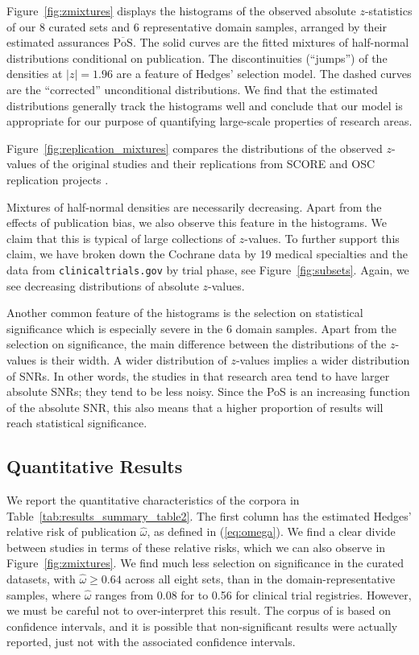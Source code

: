 \documentclass[11pt]{article}
\begin{document}
Figure~\ref{fig:zmixtures} displays the histograms of the observed absolute $z$-statistics of our 8 curated sets and 6 representative domain samples, arranged by their estimated assurances $\overline{\text{PoS}}$.
The solid curves are the fitted mixtures of half-normal distributions conditional on publication. The discontinuities (``jumps'') of the densities at $|z|=1.96$ are a feature of Hedges' selection model. The dashed curves are the ``corrected'' unconditional distributions. We find that the estimated distributions generally track the histograms well and conclude that our model is appropriate for our purpose of quantifying large-scale properties of research areas. 

Figure~\ref{fig:replication_mixtures} compares the distributions of the observed $z$-values of the original studies and their replications from SCORE and OSC replication projects \parencite{opensciencecollaborationEstimatingReproducibilityPsychological2015a,tyner2026}. 

Mixtures of half-normal densities are necessarily decreasing. Apart from the effects of publication bias, we also observe this feature in the histograms. We claim that this is typical of large collections of $z$-values. To further support this claim, we have broken down the Cochrane data by 19 medical specialties and the data from {\tt clinicaltrials.gov} by trial phase, see Figure~\ref{fig:subsets}. Again, we see decreasing distributions of absolute $z$-values.

Another common feature of the histograms is the selection on statistical significance which is especially severe in the 6 domain samples. Apart from the selection on significance, the main difference between the distributions of the $z$-values is their width. A wider distribution of $z$-values implies a wider distribution of SNRs. In other words, the studies in that research area tend to have larger absolute SNRs; they tend to be less noisy. Since the PoS is an increasing function of the absolute SNR, this also means that a higher proportion of results will reach statistical significance. 

\subsection{Quantitative Results}

We report the quantitative characteristics of the corpora in Table~\ref{tab:results_summary_table2}. The first column has the estimated Hedges' relative risk of publication $\hat \omega$, as defined in (\ref{eq:omega}). We find a clear divide between studies in terms of these relative risks, which we can also observe in Figure~\ref{fig:zmixtures}. We find much less selection on significance in the curated datasets, with $\hat \omega \geq 0.64$ across all eight sets, than in the domain-representative samples, where $\hat \omega$ ranges from 0.08 for \textcite{barnett2019examination} to 0.56 for clinical trial registries. However, we must be careful not to over-interpret this result. The corpus of \textcite{barnett2019examination} is based on confidence intervals, and it is possible that non-significant results were actually reported, just not with the associated confidence intervals.
\end{document}
